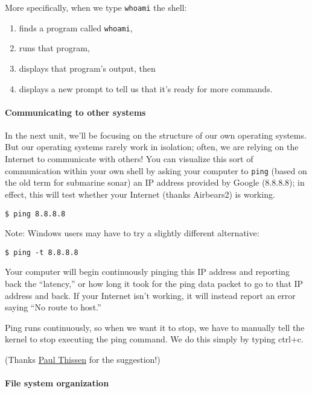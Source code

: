\documentclass[
]{book}
\providecommand{\tightlist}{%
  \setlength{\itemsep}{0pt}\setlength{\parskip}{0pt}}
\begin{document}
More specifically, when we type \texttt{whoami} the shell:

\begin{enumerate}
\def\labelenumi{\arabic{enumi}.}
\tightlist
\item
  finds a program called \texttt{whoami},
\item
  runs that program,
\item
  displays that program's output, then
\item
  displays a new prompt to tell us that it's ready for more commands.
\end{enumerate}

\hypertarget{communicating-to-other-systems}{%
\paragraph{Communicating to other systems}\label{communicating-to-other-systems}}

In the next unit, we'll be focusing on the structure of our own operating systems. But our operating systems rarely work in isolation; often, we are relying on the Internet to communicate with others! You can visualize this sort of communication within your own shell by asking your computer to \texttt{ping} (based on the old term for submarine sonar) an IP address provided by Google (8.8.8.8); in effect, this will test whether your Internet (thanks Airbears2) is working.

\begin{verbatim}
$ ping 8.8.8.8
\end{verbatim}

Note: Windows users may have to try a slightly different alternative:

\begin{verbatim}
$ ping -t 8.8.8.8
\end{verbatim}

Your computer will begin continuously pinging this IP address and reporting back the ``latency,'' or how long it took for the ping data packet to go to that IP address and back. If your Internet isn't working, it will instead report an error saying ``No route to host.''

Ping runs continuously, so when we want it to stop, we have to manually tell the kernel to stop executing the ping command. We do this simply by typing ctrl+c.~

(Thanks \href{http://www.paulthissen.org/}{Paul Thissen} for the suggestion!)

\hypertarget{file-system-organization}{%
\paragraph{File system organization}\label{file-system-organization}}
\end{document}

